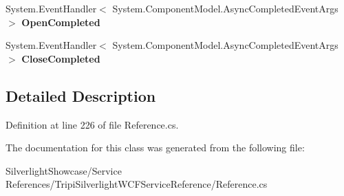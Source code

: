\begin{DoxyCompactItemize}
\item 
\hypertarget{class_silverlight_showcase_1_1_tripi_silverlight_w_c_f_service_reference_1_1_tripi_silverlight_w_c_f_service_client_a2a5a8e029676c4f3dd4a48eb82d98a09}{
System.EventHandler$<$ System.ComponentModel.AsyncCompletedEventArgs $>$ {\bfseries OpenCompleted}}
\label{class_silverlight_showcase_1_1_tripi_silverlight_w_c_f_service_reference_1_1_tripi_silverlight_w_c_f_service_client_a2a5a8e029676c4f3dd4a48eb82d98a09}

\item 
\hypertarget{class_silverlight_showcase_1_1_tripi_silverlight_w_c_f_service_reference_1_1_tripi_silverlight_w_c_f_service_client_ab3624e2c991c266a6835f3662d935fab}{
System.EventHandler$<$ System.ComponentModel.AsyncCompletedEventArgs $>$ {\bfseries CloseCompleted}}
\label{class_silverlight_showcase_1_1_tripi_silverlight_w_c_f_service_reference_1_1_tripi_silverlight_w_c_f_service_client_ab3624e2c991c266a6835f3662d935fab}

\end{DoxyCompactItemize}


\subsection{Detailed Description}


Definition at line 226 of file Reference.cs.

The documentation for this class was generated from the following file:\begin{DoxyCompactItemize}
\item 
SilverlightShowcase/Service References/TripiSilverlightWCFServiceReference/Reference.cs\end{DoxyCompactItemize}
